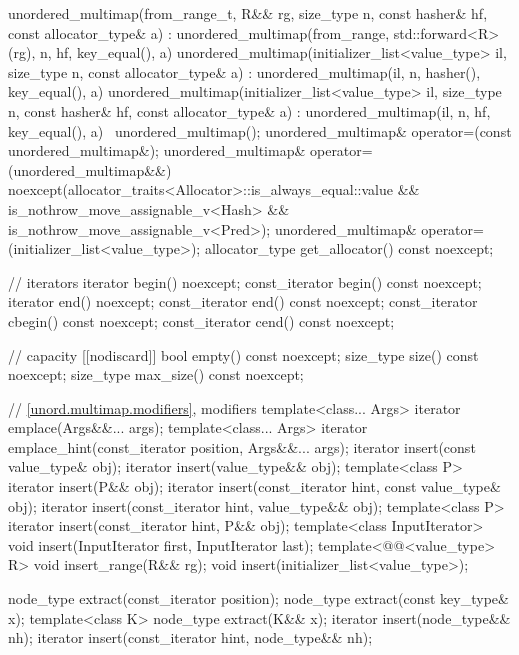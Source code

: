 \begin{codeblock}
{{    unordered_multimap(from_range_t, R&& rg, size_type n, const hasher& hf,
                       const allocator_type& a)
      : unordered_multimap(from_range, std::forward<R>(rg), n, hf, key_equal(), a) { }
    unordered_multimap(initializer_list<value_type> il, size_type n, const allocator_type& a)
      : unordered_multimap(il, n, hasher(), key_equal(), a) { }
    unordered_multimap(initializer_list<value_type> il, size_type n, const hasher& hf,
                       const allocator_type& a)
      : unordered_multimap(il, n, hf, key_equal(), a) { }
    ~unordered_multimap();
    unordered_multimap& operator=(const unordered_multimap&);
    unordered_multimap& operator=(unordered_multimap&&)
      noexcept(allocator_traits<Allocator>::is_always_equal::value &&
               is_nothrow_move_assignable_v<Hash> &&
               is_nothrow_move_assignable_v<Pred>);
    unordered_multimap& operator=(initializer_list<value_type>);
    allocator_type get_allocator() const noexcept;

    // iterators
    iterator       begin() noexcept;
    const_iterator begin() const noexcept;
    iterator       end() noexcept;
    const_iterator end() const noexcept;
    const_iterator cbegin() const noexcept;
    const_iterator cend() const noexcept;

    // capacity
    [[nodiscard]] bool empty() const noexcept;
    size_type size() const noexcept;
    size_type max_size() const noexcept;

    // \ref{unord.multimap.modifiers}, modifiers
    template<class... Args> iterator emplace(Args&&... args);
    template<class... Args> iterator emplace_hint(const_iterator position, Args&&... args);
    iterator insert(const value_type& obj);
    iterator insert(value_type&& obj);
    template<class P> iterator insert(P&& obj);
    iterator insert(const_iterator hint, const value_type& obj);
    iterator insert(const_iterator hint, value_type&& obj);
    template<class P> iterator insert(const_iterator hint, P&& obj);
    template<class InputIterator> void insert(InputIterator first, InputIterator last);
    template<@@<value_type> R>
      void insert_range(R&& rg);
    void insert(initializer_list<value_type>);

    node_type extract(const_iterator position);
    node_type extract(const key_type& x);
    template<class K> node_type extract(K&& x);
    iterator insert(node_type&& nh);
    iterator insert(const_iterator hint, node_type&& nh);

}}
\end{codeblock}
